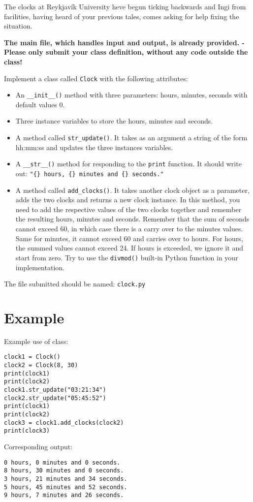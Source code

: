 
The clocks at Reykjavík University heve begun ticking backwards and Ingi from facilities, having heard of your previous tales, comes asking for help fixing the situation.

\textbf{The main file, which handles input and output, is already provided. -
Please only submit your class definition, without any code outside the class!}

Implement a class called \texttt{Clock} with the following attributes:

\begin{itemize}
    \item An \texttt{\_\_init\_\_()} method with three parameters: hours, minutes, seconds with default values 0.
    \item Three instance variables to store the hours, minutes and seconds.
    \item A method called \texttt{str\_update()}. 
    It takes as an argument a string of the form hh:mm:ss and updates the three instances variables.
    \item A \texttt{\_\_str\_\_()} method for responding to the \texttt{print} function. It should write out: \texttt{"\{\} hours, \{\} minutes and \{\} seconds."}
    \item A method called \texttt{add\_clocks()}.
    It takes another clock object as a parameter, adds the two clocks and returns a new clock instance.
    In this method, you need to add the respective values of the two clocks together and remember the resulting hours, minutes and seconds.
    Remember that the sum of seconds cannot exceed 60, in which case there is a carry over to the minutes values.
    Same for minutes, it cannot exceed 60 and carries over to hours.
    For hours, the summed values cannot exceed 24.
    If hours is exceeded, we ignore it and start from zero.
    Try to use the \texttt{divmod()} built-in Python function in your implementation.
\end{itemize}

The file submitted should be named: \texttt{clock.py}


\section*{Example}
Example use of class:
\begin{verbatim}
clock1 = Clock()
clock2 = Clock(8, 30)
print(clock1)
print(clock2)
clock1.str_update("03:21:34")
clock2.str_update("05:45:52")
print(clock1)
print(clock2)
clock3 = clock1.add_clocks(clock2)
print(clock3)
\end{verbatim}
    

Corresponding output:
\begin{verbatim}
0 hours, 0 minutes and 0 seconds.
8 hours, 30 minutes and 0 seconds.
3 hours, 21 minutes and 34 seconds.
5 hours, 45 minutes and 52 seconds.
9 hours, 7 minutes and 26 seconds.
\end{verbatim}
